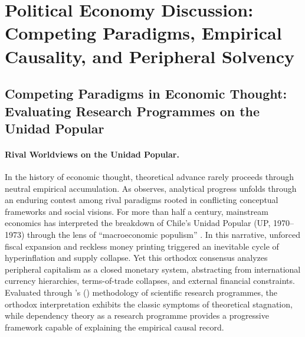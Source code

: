 \section{Political Economy Discussion: Competing Paradigms, Empirical Causality, and Peripheral Solvency}
\label{sec:discussion_conclusion}

\subsection{Competing Paradigms in Economic Thought: Evaluating Research Programmes on the Unidad Popular}
\label{sec:competing_paradigms}

\paragraph{Rival Worldviews on the Unidad Popular.}
In the history of economic thought, theoretical advance rarely proceeds through neutral empirical accumulation. As \citet{Roncaglia2006} observes, analytical progress unfolds through an enduring contest among rival paradigms rooted in conflicting conceptual frameworks and social visions. For more than half a century, mainstream economics has interpreted the breakdown of Chile's Unidad Popular (UP, 1970--1973) through the lens of ``macroeconomic populism'' \citep{DornbuschEdwards1990,Edwards2024}. In this narrative, unforced fiscal expansion and reckless money printing triggered an inevitable cycle of hyperinflation and supply collapse. Yet this orthodox consensus analyzes peripheral capitalism as a closed monetary system, abstracting from international currency hierarchies, terms-of-trade collapses, and external financial constraints. Evaluated through \citeauthor{Lakatos1978}'s (\citeyear{Lakatos1978}) methodology of scientific research programmes, the orthodox interpretation exhibits the classic symptoms of theoretical stagnation, while dependency theory as a research programme \citep{Kvangraven2021} provides a progressive framework capable of explaining the empirical causal record.

